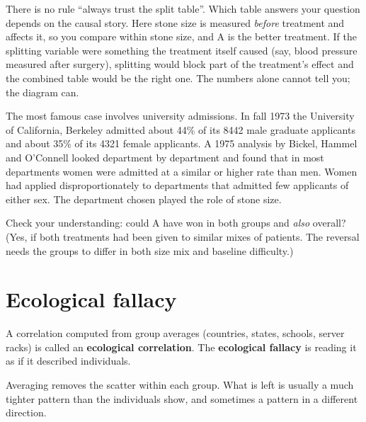 \begin{trapbox}
There is no rule ``always trust the split table''. Which table answers your question
depends on the causal story. Here stone size is measured \emph{before} treatment and
affects it, so you compare within stone size, and A is the better treatment. If the
splitting variable were something the treatment itself caused (say, blood pressure
measured after surgery), splitting would block part of the treatment's effect and
the combined table would be the right one. The numbers alone cannot tell you;
the diagram can.
\end{trapbox}

The most famous case involves university admissions. In fall 1973 the University
of California, Berkeley admitted about 44\% of its 8442 male graduate applicants
and about 35\% of its 4321 female applicants. A 1975 analysis by Bickel, Hammel and
O'Connell looked department by department and found that in most departments women
were admitted at a similar or higher rate than men. Women had applied
disproportionately to departments that admitted few applicants of either sex.
The department chosen played the role of stone size.

\begin{recoverybox}
Check your understanding: could A have won in both groups and \emph{also} overall?
(Yes, if both treatments had been given to similar mixes of patients. The reversal
needs the groups to differ in both size mix and baseline difficulty.)
\end{recoverybox}

\section{Ecological fallacy}
\label{sec:corr-ecological}

A correlation computed from group averages (countries, states, schools, server
racks) is called an \textbf{ecological correlation}. The \textbf{ecological
fallacy} is reading it as if it described individuals.

Averaging removes the scatter within each group. What is left is usually a much
tighter pattern than the individuals show, and sometimes a pattern in a different
direction.

